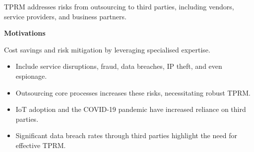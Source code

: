 


TPRM addresses risks from outsourcing to third parties, including vendors,
service providers, and business partners.

\begin{orkeybox}
{\sffamily\bfseries\fontsize{8.6}{10}\selectfont\color{navy}Motivations}\par
\vspace{2pt}
Cost savings and risk mitigation by leveraging specialised expertise.
\end{orkeybox}

\begin{itemize}
\item Include service disruptions, fraud, data breaches, IP theft, and even
espionage.
\item Outsourcing core processes increases these risks, necessitating robust
TPRM.
\end{itemize}

\begin{itemize}
\item IoT adoption and the COVID-19 pandemic have increased reliance on third
parties.
\item Significant data breach rates through third parties highlight the need for
effective TPRM.
\end{itemize}


